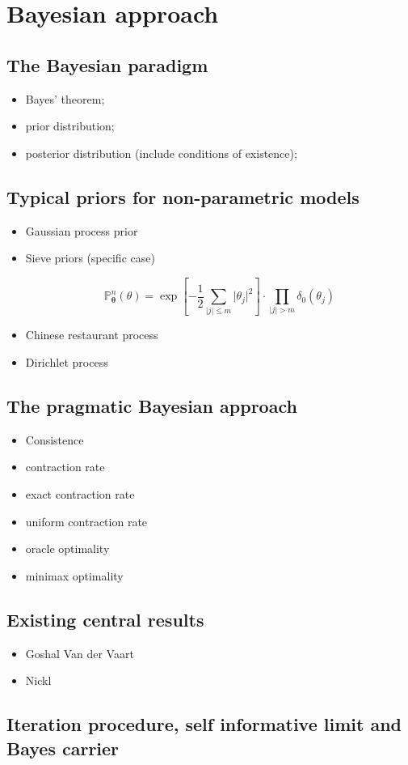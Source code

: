 \section{Bayesian approach}\label{1.3}

\subsection{The Bayesian paradigm}\label{1.3.1}
\begin{itemize}
\item Bayes' theorem;
\item prior distribution;
\item posterior distribution (include conditions of existence);
\end{itemize}

\subsection{Typical priors for non-parametric models}\label{1.3.2}
\begin{itemize}
\item Gaussian process prior
\item Sieve priors (specific case)

\[\mathds{P}^{n}_{\boldsymbol{\theta}}(\theta) = \exp\left[-\frac{1}{2}\sum\limits_{\vert j \vert \leq m} \vert \theta_{j} \vert^{2}\right] \cdot \prod\limits_{\vert j \vert > m}\delta_{0}(\theta_{j})\]

\item Chinese restaurant process
\item Dirichlet process
\end{itemize}

\subsection{The pragmatic Bayesian approach}\label{1.3.3}
\begin{itemize}
\item Consistence
\item contraction rate
\item exact contraction rate
\item uniform contraction rate
\item oracle optimality
\item minimax optimality
\end{itemize}

\subsection{Existing central results}\label{1.3.4}
\begin{itemize}
\item Goshal Van der Vaart
\item Nickl
\end{itemize}

\subsection{Iteration procedure, self informative limit and Bayes carrier}\label{1.3.5}